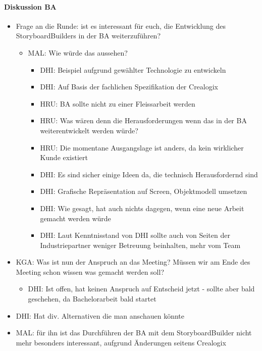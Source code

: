 \paragraph*{Diskussion BA}
\begin{itemize}
	\item Frage an die Runde: ist es interessant für euch, die Entwicklung des StoryboardBuilders in der BA weiterzuführen?
	\begin{itemize}
		\item MAL: Wie würde das aussehen?
		\begin{itemize}
			\item DHI: Beispiel aufgrund gewählter Technologie zu entwickeln
			\item DHI: Auf Basis der fachlichen Spezifikation der Crealogix
			\item HRU: BA sollte nicht zu einer Fleissarbeit werden
			\item HRU: Was wären denn die Herausforderungen wenn das in der BA weiterentwickelt werden würde?
			\item HRU: Die momentane Ausgangslage ist anders, da kein wirklicher Kunde existiert
			\item DHI: Es sind sicher einige Ideen da, die technisch Herausfordernd sind
			\item DHI: Grafische Repräsentation auf Screen, Objektmodell umsetzen
			\item DHI: Wie gesagt, hat auch nichts dagegen, wenn eine neue Arbeit gemacht werden würde
			\item DHI: Laut Kenntnisstand von DHI sollte auch von Seiten der Industriepartner weniger Betreuung beinhalten, mehr vom Team
		\end{itemize}
	\end{itemize}
	\item KGA: Was ist nun der Anspruch an das Meeting? Müssen wir am Ende des Meeting schon wissen was gemacht werden soll?
	\begin{itemize}
		\item DHI: Ist offen, hat keinen Anspruch auf Entscheid jetzt - sollte aber bald geschehen, da Bachelorarbeit bald startet
	\end{itemize}
	\item DHI: Hat div. Alternativen die man anschauen könnte
	\item MAL: für ihn ist das Durchführen der BA mit dem StoryboardBuilder nicht mehr besonders interessant, aufgrund Änderungen seitens Crealogix
	\begin{itemize}

\end{itemize}
\end{itemize}
